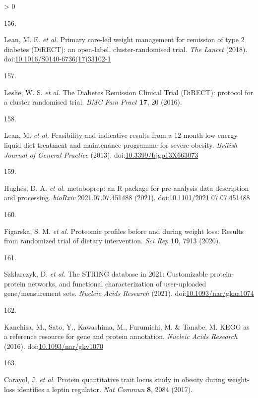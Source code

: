 \documentclass[11pt,twoside]{bristolthesis}
\newlength{\cslhangindent}
\newlength{\csllabelwidth}
\newenvironment{CSLReferences}[2] %
 {%
  \setlength{\parindent}{0pt}
  \ifodd #1 \everypar{\setlength{\hangindent}{\cslhangindent}}\ignorespaces\fi
  \ifnum #2 > 0
  \setlength{\parskip}{#2\baselineskip}
  \fi
 }%
 {}
\newcommand{\CSLLeftMargin}[1]{\parbox[t]{\csllabelwidth}{#1}}
\newcommand{\CSLRightInline}[1]{\parbox[t]{\linewidth - \csllabelwidth}{#1}\break}
\begin{document}
\begin{CSLReferences}{0}{0}
\leavevmode\hypertarget{ref-Lean2018}{}%
\CSLLeftMargin{156. }
\CSLRightInline{Lean, M. E. \emph{et al.} {Primary care-led weight management for remission of type 2 diabetes (DiRECT): an open-label, cluster-randomised trial}. \emph{The Lancet} (2018). doi:\href{https://doi.org/10.1016/S0140-6736(17)33102-1}{10.1016/S0140-6736(17)33102-1}}

\leavevmode\hypertarget{ref-Leslie2016}{}%
\CSLLeftMargin{157. }
\CSLRightInline{Leslie, W. S. \emph{et al.} {The Diabetes Remission Clinical Trial (DiRECT): protocol for a cluster randomised trial}. \emph{BMC Fam Pract} \textbf{17}, 20 (2016).}

\leavevmode\hypertarget{ref-Lean2013}{}%
\CSLLeftMargin{158. }
\CSLRightInline{Lean, M. \emph{et al.} {Feasibility and indicative results from a 12-month low-energy liquid diet treatment and maintenance programme for severe obesity}. \emph{British Journal of General Practice} (2013). doi:\href{https://doi.org/10.3399/bjgp13X663073}{10.3399/bjgp13X663073}}

\leavevmode\hypertarget{ref-Hughes2021}{}%
\CSLLeftMargin{159. }
\CSLRightInline{Hughes, D. A. \emph{et al.} {metaboprep: an R package for pre-analysis data description and processing}. \emph{bioRxiv} 2021.07.07.451488 (2021). doi:\href{https://doi.org/10.1101/2021.07.07.451488}{10.1101/2021.07.07.451488}}

\leavevmode\hypertarget{ref-Figarska2020}{}%
\CSLLeftMargin{160. }
\CSLRightInline{Figarska, S. M. \emph{et al.} {Proteomic profiles before and during weight loss: Results from randomized trial of dietary intervention}. \emph{Sci Rep} \textbf{10}, 7913 (2020).}

\leavevmode\hypertarget{ref-Szklarczyk2021}{}%
\CSLLeftMargin{161. }
\CSLRightInline{Szklarczyk, D. \emph{et al.} {The STRING database in 2021: Customizable protein-protein networks, and functional characterization of user-uploaded gene/measurement sets}. \emph{Nucleic Acids Research} (2021). doi:\href{https://doi.org/10.1093/nar/gkaa1074}{10.1093/nar/gkaa1074}}

\leavevmode\hypertarget{ref-Kanehisa2016}{}%
\CSLLeftMargin{162. }
\CSLRightInline{Kanehisa, M., Sato, Y., Kawashima, M., Furumichi, M. \& Tanabe, M. {KEGG as a reference resource for gene and protein annotation}. \emph{Nucleic Acids Research} (2016). doi:\href{https://doi.org/10.1093/nar/gkv1070}{10.1093/nar/gkv1070}}

\leavevmode\hypertarget{ref-Carayol2017}{}%
\CSLLeftMargin{163. }
\CSLRightInline{Carayol, J. \emph{et al.} {Protein quantitative trait locus study in obesity during weight-loss identifies a leptin regulator}. \emph{Nat Commun} \textbf{8}, 2084 (2017).}


\end{CSLReferences}
\end{document}
